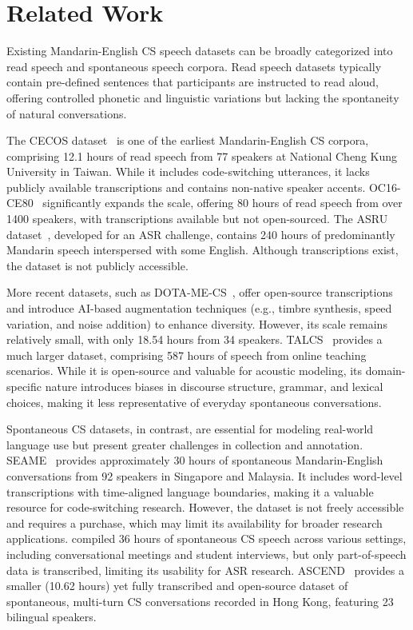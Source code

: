 \section{Related Work}
Existing Mandarin-English CS speech datasets can be broadly categorized into read speech and spontaneous speech corpora. Read speech datasets typically contain pre-defined sentences that participants are instructed to read aloud, offering controlled phonetic and linguistic variations but lacking the spontaneity of natural conversations.  

The CECOS dataset~\cite{shen2011cecos} is one of the earliest Mandarin-English CS corpora, comprising 12.1 hours of read speech from 77 speakers at National Cheng Kung University in Taiwan. While it includes code-switching utterances, it lacks publicly available transcriptions and contains non-native speaker accents. OC16-CE80~\cite{wang2016oc16} significantly expands the scale, offering 80 hours of read speech from over 1400 speakers, with transcriptions available but not open-sourced. The ASRU dataset~\cite{shi2020asru}, developed for an ASR challenge, contains 240 hours of predominantly Mandarin speech interspersed with some English. Although transcriptions exist, the dataset is not publicly accessible.  

More recent datasets, such as DOTA-ME-CS~\cite{li2025dota}, offer open-source transcriptions and introduce AI-based augmentation techniques (e.g., timbre synthesis, speed variation, and noise addition) to enhance diversity. However, its scale remains relatively small, with only 18.54 hours from 34 speakers. TALCS~\cite{TALCS} provides a much larger dataset, comprising 587 hours of speech from online teaching scenarios. While it is open-source and valuable for acoustic modeling, its domain-specific nature introduces biases in discourse structure, grammar, and lexical choices, making it less representative of everyday spontaneous conversations.  

Spontaneous CS datasets, in contrast, are essential for modeling real-world language use but present greater challenges in collection and annotation. SEAME~\cite{SEAME} provides approximately 30 hours of spontaneous Mandarin-English conversations from 92 speakers in Singapore and Malaysia. It includes word-level transcriptions with time-aligned language boundaries, making it a valuable resource for code-switching research. However, the dataset is not freely accessible and requires a purchase, which may limit its availability for broader research applications.
\citet{li2012mandarin} compiled 36 hours of spontaneous CS speech across various settings, including conversational meetings and student interviews, but only part-of-speech data is transcribed, limiting its usability for ASR research. ASCEND~\cite{ASCEND} provides a smaller (10.62 hours) yet fully transcribed and open-source dataset of spontaneous, multi-turn CS conversations recorded in Hong Kong, featuring 23 bilingual speakers.  


